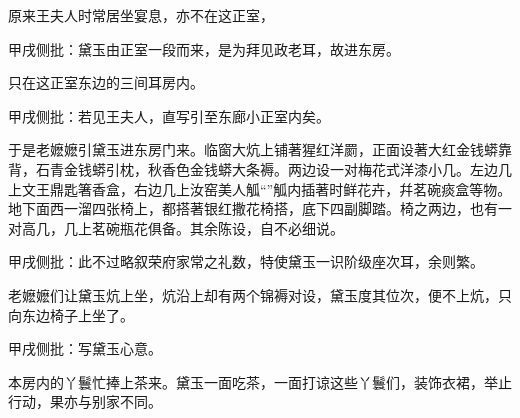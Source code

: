 \begin{parag}
    原来王夫人时常居坐宴息，亦不在这正室，\begin{note}甲戌侧批：黛玉由正室一段而来，是为拜见政老耳，故进东房。\end{note}只在这正室东边的三间耳房内。\begin{note}甲戌侧批：若见王夫人，直写引至东廊小正室内矣。\end{note}于是老嬷嬷引黛玉进东房门来。临窗大炕上铺著猩红洋罽，正面设著大红金钱蟒靠背，石青金钱蟒引枕，秋香色金钱蟒大条褥。两边设一对梅花式洋漆小几。左边几上文王鼎匙箸香盒，右边几上汝窑美人觚“”觚内插著时鲜花卉，幷茗碗痰盒等物。地下面西一溜四张椅上，都搭著银红撒花椅搭，底下四副脚踏。椅之两边，也有一对高几，几上茗碗瓶花俱备。其余陈设，自不必细说。\begin{note}甲戌侧批：此不过略叙荣府家常之礼数，特使黛玉一识阶级座次耳，余则繁。\end{note}老嬷嬷们让黛玉炕上坐，炕沿上却有两个锦褥对设，黛玉度其位次，便不上炕，只向东边椅子上坐了。\begin{note}甲戌侧批：写黛玉心意。\end{note}本房内的丫鬟忙捧上茶来。黛玉一面吃茶，一面打谅这些丫鬟们，装饰衣裙，举止行动，果亦与别家不同。
\end{parag}



